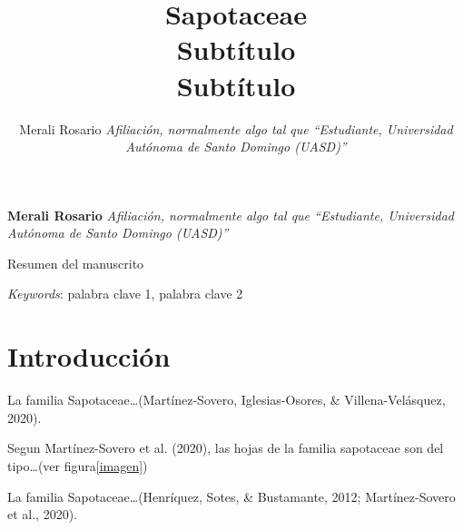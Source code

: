 \documentclass[11pt,]{article}
\title{Sapotaceae\\
Subtítulo\\
Subtítulo  }
\author{\Large Merali Rosario\vspace{0.05in} \newline\normalsize\emph{Afiliación, normalmente algo tal que ``Estudiante, Universidad Autónoma
de Santo Domingo (UASD)''}  }
\date{}
\newcommand*{\authorfont}{\fontfamily{phv}\selectfont}
\renewenvironment{abstract}
 {{%
    \setlength{\leftmargin}{0mm}
    \setlength{\rightmargin}{\leftmargin}%
  }%
  \relax}
 {\endlist}
\begin{document}
	
%

{%
\setlength{\parindent}{0pt}
\thispagestyle{plain}
{\fontsize{18}{20}\selectfont\raggedright 
\maketitle  %

}

{
   \vskip 13.5pt\relax \normalsize\fontsize{11}{12} 
\textbf{\authorfont Merali Rosario} \hskip 15pt \emph{\small Afiliación, normalmente algo tal que ``Estudiante, Universidad Autónoma
de Santo Domingo (UASD)''}   

}

}








\begin{abstract}

    \hbox{\vrule height .2pt width 39.14pc}

    \vskip 8.5pt %

\noindent Resumen del manuscrito


\vskip 8.5pt \noindent \emph{Keywords}: palabra clave 1, palabra clave 2 \par

    \hbox{\vrule height .2pt width 39.14pc}



\end{abstract}


\vskip 6.5pt


\noindent  \section{Introducción}\label{introducciuxf3n}

La familia Sapotaceae\ldots{}(Martínez-Sovero, Iglesias-Osores, \&
Villena-Velásquez, 2020).

Segun Martínez-Sovero et al. (2020), las hojas de la familia sapotaceae
son del tipo\ldots{}(ver figura\ref{imagen})

La familia Sapotaceae\ldots{}(Henríquez, Sotes, \& Bustamante, 2012;
Martínez-Sovero et al., 2020).
\end{document}

